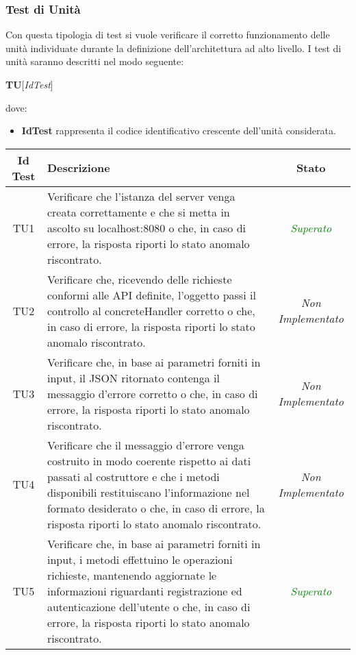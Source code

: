 \subsubsection{Test di Unità}
Con questa tipologia di test si vuole verificare il corretto funzionamento delle unità individuate durante la definizione dell'architettura ad alto livello.
I test di unità saranno descritti nel modo seguente:
\begin{center}
\textbf{TU}[\textit{IdTest}]
\end{center}
dove:
\begin{itemize}
\item \textbf{IdTest} rappresenta il codice identificativo crescente dell'unità considerata.
\end{itemize}

\normalsize
\begin{longtable}{|c|>{}m{10cm}|c|}
\hline 
\textbf{Id Test} & \textbf{Descrizione} & \textbf{Stato}\\
\hline
\endhead
\hypertarget{TU1}{TU1} & Verificare che l’istanza del server venga creata correttamente e che si metta in ascolto su localhost:8080 o che, in caso di errore, la risposta riporti lo stato anomalo riscontrato. & \textcolor{Green}{\textit{Superato}}\\ \hline
\hypertarget{TU2}{TU2} & Verificare che, ricevendo delle richieste conformi alle API definite, l’oggetto passi il controllo al
concreteHandler corretto o che, in caso di errore, la risposta riporti lo stato anomalo riscontrato. & \textit{Non Implementato}\\ \hline
\hypertarget{TU3}{TU3} & Verificare che, in base ai parametri forniti in input, il
JSON ritornato contenga il messaggio d’errore corretto o che, in caso di errore, la risposta riporti lo
stato anomalo riscontrato. & \textit{Non Implementato}\\ \hline
\hypertarget{TU4}{TU4} & Verificare che il messaggio d’errore venga costruito
in modo coerente rispetto ai dati passati al costruttore
e che i metodi disponibili restituiscano l’informazione nel formato desiderato o che, in caso di errore, la
risposta riporti lo stato anomalo riscontrato. & \textit{Non Implementato}\\ \hline
\hypertarget{TU5}{TU5} & Verificare che, in base ai parametri forniti in input, i
metodi effettuino le operazioni richieste, mantenendo
aggiornate le informazioni riguardanti registrazione
ed autenticazione dell’utente o che, in caso di errore,
la risposta riporti lo stato anomalo riscontrato. & \textcolor{Green}{\textit{Superato}}\\ \hline

\end{longtable}
